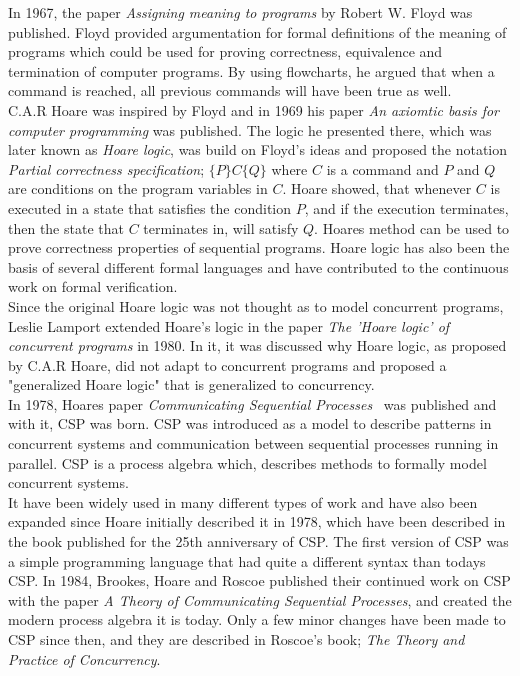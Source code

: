 In 1967, the paper \textit{Assigning meaning to programs}\cite{Floyd1967} by Robert W. Floyd was published. Floyd provided argumentation for formal definitions of the meaning of programs which could be used for proving correctness, equivalence and termination of computer programs. By using flowcharts, he argued that when a command is reached, all previous commands will have been true as well.\\ C.A.R Hoare was inspired by Floyd and in 1969 his paper \textit{An axiomtic basis for computer programming}\cite{Hoare1969} was published. The logic he presented there, which was later known as \textit{Hoare logic}, was build on Floyd's ideas and proposed the notation \textit{Partial correctness specification}; $\{P\} C \{Q\}$ where $C$ is a command and $P$ and $Q$ are conditions on the program variables in $C$. Hoare showed, that whenever $C$ is executed in a state that satisfies the condition $P$, and if the execution terminates, then the state that $C$ terminates in, will satisfy $Q$. Hoares method can be used to prove correctness properties of sequential programs. Hoare logic has also been the basis of several different formal languages and have contributed to the continuous work on formal verification. \\
Since the original Hoare logic was not thought as to model concurrent programs, Leslie Lamport extended Hoare's logic in the paper \textit{The 'Hoare logic' of concurrent programs}\cite{Lamport1980} in 1980. In it, it was discussed why Hoare logic, as proposed by C.A.R Hoare, did not adapt to concurrent programs and proposed a "generalized Hoare logic" that is generalized to concurrency. \\

In 1978, Hoares paper \textit{Communicating Sequential Processes}~\cite{Hoare1978} was published and with it, CSP was born.
CSP was introduced as a model to describe patterns in concurrent systems and communication between sequential processes running in parallel. CSP is a process algebra which, describes methods to formally model concurrent systems.\\
It have been widely used in many different types of work and have also been expanded since Hoare initially described it in 1978, which have been described in the book\cite{Abdallah2005} published for the 25th anniversary of CSP.
The first version of CSP was a simple programming language that had quite a different syntax than todays CSP. In 1984, Brookes, Hoare and Roscoe published their continued work on CSP with the paper \textit{A Theory of Communicating Sequential Processes}\cite{Brookes1984}, and created the modern process algebra it is today. Only a few minor changes have been made to CSP since then, and they are described in Roscoe's book; \textit{The Theory and Practice of Concurrency}\cite{Roscoe1997}.\\

